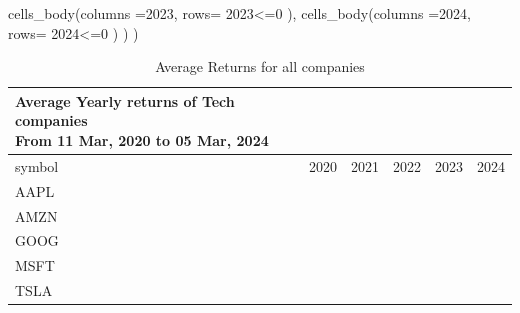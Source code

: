 \documentclass[
  letterpaper,
  DIV=11,
  numbers=noendperiod]{scrreprt}
\newenvironment{Shaded}{\begin{snugshade}}{\end{snugshade}}
\newcommand{\AttributeTok}[1]{\textcolor[rgb]{0.40,0.45,0.13}{#1}}
\newcommand{\DecValTok}[1]{\textcolor[rgb]{0.68,0.00,0.00}{#1}}
\newcommand{\FunctionTok}[1]{\textcolor[rgb]{0.28,0.35,0.67}{#1}}
\newcommand{\NormalTok}[1]{\textcolor[rgb]{0.00,0.23,0.31}{#1}}
\newcommand{\SpecialCharTok}[1]{\textcolor[rgb]{0.37,0.37,0.37}{#1}}
\newcommand{\StringTok}[1]{\textcolor[rgb]{0.13,0.47,0.30}{#1}}
\theoremstyle{definition}
\theoremstyle{remark}
\begin{document}
\begin{Shaded}
\begin{Highlighting}[]
       \FunctionTok{cells\_body}\NormalTok{(}\AttributeTok{columns =}\StringTok{\textasciigrave{}}\AttributeTok{2023}\StringTok{\textasciigrave{}}\NormalTok{, }
                 \AttributeTok{rows=} \StringTok{\textasciigrave{}}\AttributeTok{2023}\StringTok{\textasciigrave{}}\SpecialCharTok{\textless{}=}\DecValTok{0}\NormalTok{ ), }
      \FunctionTok{cells\_body}\NormalTok{(}\AttributeTok{columns =}\StringTok{\textasciigrave{}}\AttributeTok{2024}\StringTok{\textasciigrave{}}\NormalTok{, }
                 \AttributeTok{rows=} \StringTok{\textasciigrave{}}\AttributeTok{2024}\StringTok{\textasciigrave{}}\SpecialCharTok{\textless{}=}\DecValTok{0}\NormalTok{ )}
\NormalTok{    )}
\NormalTok{  )}
\end{Highlighting}
\end{Shaded}

\begin{longtable}{lrrrrr}

\caption{\label{tbl-average-returns-all-companies}Average Returns for
all companies}

\tabularnewline

\caption*{
{\large Average Yearly returns of Tech companies} \\ 
{\small From 11 Mar, 2020 to 05 Mar, 2024}
} \\ 
\toprule
symbol & 2020 & 2021 & 2022 & 2023 & 2024 \\ 
\midrule\addlinespace[2.5pt]
AAPL & \cellcolor[HTML]{90EE90}{\textcolor[HTML]{FFFFFF}{$0.0037$}} & \cellcolor[HTML]{90EE90}{\textcolor[HTML]{FFFFFF}{$0.0012$}} & \cellcolor[HTML]{FF0000}{\textcolor[HTML]{FFFFFF}{$-0.0012$}} & \cellcolor[HTML]{90EE90}{\textcolor[HTML]{FFFFFF}{$0.0016$}} & \cellcolor[HTML]{FF0000}{\textcolor[HTML]{FFFFFF}{$-0.0022$}} \\ 
AMZN & \cellcolor[HTML]{90EE90}{\textcolor[HTML]{FFFFFF}{$0.0033$}} & \cellcolor[HTML]{90EE90}{\textcolor[HTML]{FFFFFF}{$0.0001$}} & \cellcolor[HTML]{FF0000}{\textcolor[HTML]{FFFFFF}{$-0.0027$}} & \cellcolor[HTML]{90EE90}{\textcolor[HTML]{FFFFFF}{$0.0024$}} & \cellcolor[HTML]{90EE90}{\textcolor[HTML]{FFFFFF}{$0.0036$}} \\ 
GOOG & \cellcolor[HTML]{90EE90}{\textcolor[HTML]{FFFFFF}{$0.0022$}} & \cellcolor[HTML]{90EE90}{\textcolor[HTML]{FFFFFF}{$0.0020$}} & \cellcolor[HTML]{FF0000}{\textcolor[HTML]{FFFFFF}{$-0.0019$}} & \cellcolor[HTML]{90EE90}{\textcolor[HTML]{FFFFFF}{$0.0019$}} & \cellcolor[HTML]{FF0000}{\textcolor[HTML]{FFFFFF}{$-0.0011$}} \\ 
MSFT & \cellcolor[HTML]{90EE90}{\textcolor[HTML]{FFFFFF}{$0.0023$}} & \cellcolor[HTML]{90EE90}{\textcolor[HTML]{FFFFFF}{$0.0016$}} & \cellcolor[HTML]{FF0000}{\textcolor[HTML]{FFFFFF}{$-0.0013$}} & \cellcolor[HTML]{90EE90}{\textcolor[HTML]{FFFFFF}{$0.0018$}} & \cellcolor[HTML]{90EE90}{\textcolor[HTML]{FFFFFF}{$0.0023$}} \\ 
TSLA & \cellcolor[HTML]{90EE90}{\textcolor[HTML]{FFFFFF}{$0.0090$}} & \cellcolor[HTML]{90EE90}{\textcolor[HTML]{FFFFFF}{$0.0016$}} & \cellcolor[HTML]{FF0000}{\textcolor[HTML]{FFFFFF}{$-0.0042$}} & \cellcolor[HTML]{90EE90}{\textcolor[HTML]{FFFFFF}{$0.0028$}} & \cellcolor[HTML]{FF0000}{\textcolor[HTML]{FFFFFF}{$-0.0065$}} \\ 
\bottomrule


\end{longtable}
\end{document}
